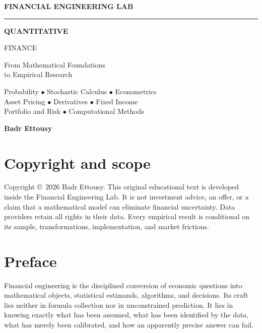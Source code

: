 \documentclass[12pt,oneside,openany]{book}
\begin{document}
\frontmatter
\hypersetup{pageanchor=false}
\begin{titlepage}
  \pagecolor{navy}\color{white}
  \vspace*{1.3cm}
  {\sffamily\bfseries\fontsize{15}{18}\selectfont FINANCIAL ENGINEERING LAB}\par
  \vspace{0.45cm}\color{gold}\rule{0.96\linewidth}{1.8pt}\color{white}
  \vspace{1.7cm}
  {\sffamily\bfseries\fontsize{35}{41}\selectfont QUANTITATIVE\par FINANCE}\par
  \vspace{0.6cm}
  {\sffamily\fontsize{20}{25}\selectfont From Mathematical Foundations\\to Empirical Research}\par
  \vfill
  \begin{minipage}{0.82\textwidth}
    \color{mist}\large Probability $\bullet$ Stochastic Calculus $\bullet$ Econometrics\\[0.2cm]
    Asset Pricing $\bullet$ Derivatives $\bullet$ Fixed Income\\[0.2cm]
    Portfolio and Risk $\bullet$ Computational Methods
  \end{minipage}
  \vfill
  {\Large\bfseries Badr Ettousy}\par
  \vspace{0.25cm}{\large Research monograph and reproducible laboratory}\par
  \vspace{0.55cm}{\small Second expanded edition $\mid$ 2026}
\end{titlepage}
\hypersetup{pageanchor=true}
\nopagecolor\color{ink}

\chapter*{Copyright and scope}
Copyright \copyright\ 2026 Badr Ettousy. This original educational text is developed
inside the Financial Engineering Lab. It is not investment advice, an offer, or a
claim that a mathematical model can eliminate financial uncertainty. Data providers
retain all rights in their data. Every empirical result is conditional on its sample,
transformations, implementation, and market frictions.

\chapter*{Preface}
Financial engineering is the disciplined conversion of economic questions into
mathematical objects, statistical estimands, algorithms, and decisions. Its craft
lies neither in formula collection nor in unconstrained prediction. It lies in
knowing exactly what has been assumed, what has been identified by the data, what
has merely been calibrated, and how an apparently precise answer can fail.
\end{document}
